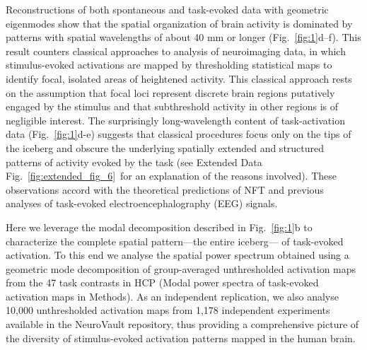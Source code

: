 \documentclass[sn-mathphys-num]{sn-jnl}%
\theoremstyle{thmstyleone}%
\theoremstyle{thmstyletwo}%
\theoremstyle{thmstylethree}%
\begin{document}
Reconstructions of both spontaneous and task-evoked data with geometric eigenmodes show that the spatial organization of brain activity is dominated by patterns with spatial wavelengths of about 40 mm or longer (Fig.~\ref{fig:1}d–f). 
This result counters classical approaches to analysis of neuroimaging data, in which stimulus-evoked activations are mapped by thresholding statistical maps to identify focal, isolated areas of heightened activity. 
This classical approach rests on the assumption that focal loci represent discrete brain regions putatively engaged by the stimulus and that subthreshold activity in other regions is of negligible interest. 
The surprisingly long-wavelength content of task-activation data (Fig.~\ref{fig:1}d-e) suggests that classical procedures focus only on the tips of the iceberg and obscure the underlying spatially extended and structured patterns of activity evoked by the task (see Extended Data Fig.~\ref{fig:extended_fig_6}~for an explanation of the reasons involved). 
These observations accord with the theoretical predictions of NFT and previous analyses of task-evoked electroencephalography (EEG) signals\cite{robinson2001modal,wingeier2001spherical}.


Here we leverage the modal decomposition described in Fig.~\ref{fig:1}b to characterize the complete spatial pattern—the entire iceberg— of task-evoked activation. 
To this end we analyse the spatial power spectrum obtained using a geometric mode decomposition of group-averaged unthresholded activation maps from the 47 task contrasts in HCP\cite{van2013wu,gorgolewski2015neurovault} (Modal power spectra of task-evoked activation maps in Methods). 
As an independent replication, we also analyse 10,000 unthresholded activation maps from 1,178 independent experiments available in the NeuroVault repository\cite{van2013wu,gorgolewski2015neurovault}, thus providing a comprehensive picture of the diversity of stimulus-evoked activation patterns mapped in the human brain.
\end{document}
